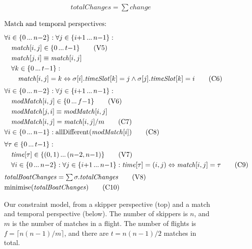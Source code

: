 \documentclass{llncs}
\newcommand{\match}{\mathit{match}}
\newcommand{\timeSlot}{\mathit{timeSlot}}
\newcommand{\change}{\mathit{change}}
\newcommand{\totalChanges}{\mathit{totalChanges}}
\newcommand{\totalBoatChanges}{\mathit{totalBoatChanges}}
\newcommand{\modMatch}{\mathit{modMatch}}
\newcommand{\timeVar}{\mathit{time}}
\newcommand{\allDifferent}{\mathrm{allDifferent}}
\newcommand{\minimise}{\mathrm{minimise}}
\newcommand\nldots{\,\hbox to 0.8em{.\hss.\hss.}\,}
\begin{document}
\begin{figure}[p]
\begin{framed}
\begin{align}
    & \totalChanges = \textstyle\sum \change \label{C5} \tag{C5}
\end{align}
\end{framed}\begin{framed}
\begin{align}
    \intertext{Match and temporal perspectives:\smallskip}
    & \forall i \in \{0 \nldots n{-}2\} : \forall j \in \{ i{+}1 \nldots n{-}1 \} : \nonumber \\
    & \hspace*{1em} \match[{i,j}] \in \{0 \nldots t{-}1\} \tag{V5} \label{V5} \\
    & \hspace*{1em} \match[{j,i}] \equiv \match[{i,j}] \nonumber \\
    & \hspace*{1em} \forall k \in \{0 \nldots t{-}1 \} : \nonumber \\
    & \hspace*{2em} \match[{i,j}] = k \Leftrightarrow \sigma[{i}].\timeSlot[{k}] = j \wedge \sigma[{j}].\timeSlot[{k}] = i \tag{C6} \label{C6} \\[0.1cm]
    & \forall i \in \{0 \nldots n{-}2\} : \forall j \in \{ i{+}1 \nldots n{-}1 \} \nonumber : \\
    & \hspace*{1em} \modMatch[{i,j}] \in \{0 \nldots f{-}1\} \label{V6} \tag{V6} \\
    & \hspace*{1em} \modMatch[{j,i}] \equiv \modMatch[{i,j}] \nonumber  \\
    & \hspace*{1em} \modMatch[{i,j}] = \match[{i,j}] / m \tag{C7} \label{C7} \\
    & \forall i \in \{0 \nldots n{-}1 \} : \allDifferent(\modMatch[{i}]) \tag{C8} \label{C8} \\[0.1cm]
    & \forall \tau \in \{0 \nldots t{-}1 \} : \nonumber \\
    & \hspace*{1em} \timeVar[{\tau}] \in \{(0,1) \nldots (n{-}2,n{-}1)\} \tag{V7} \label{V7} \\
    & \hspace*{1em} \forall i \in \{0 \nldots n{-}2\} : \forall  j \in \{ i{+}1 \nldots n{-}1 \} : \timeVar[{\tau}] = (i,j) \Leftrightarrow \match[{i,j}] = \tau \tag{C9} \label{C9} \\[0.1cm]
    & \totalBoatChanges = \textstyle\sum \sigma.\totalChanges \label{V8} \tag{V8} \\
    & \minimise(\totalBoatChanges) \label{C10} \tag{C10}
\end{align}
\end{framed}
\caption{Our constraint model, from a skipper perspective (top) and a match and temporal perspective
(below). The number of skippers is $n$, and $m$ is the number of matches in a flight. The number of
flights is $f = \lceil n(n-1)/m \rceil$, and there are $t = n(n-1)/2$ matches in
total.}\label{model:stage1}
\end{figure}
\end{document}
